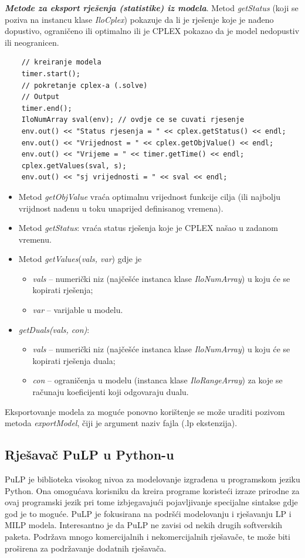 \documentclass[a4paper, utf8, 11pt, colorlinks]{article}
\begin{document}
 \noindent \textbf{\emph{Metode za eksport rješenja (statistike) iz modela}}. Metod \emph{getStatus} (koji se poziva na instancu klase \emph{IloCplex})  pokazuje da li je rješenje koje je nađeno dopustivo, ograničeno ili optimalno ili je CPLEX pokazao da je model nedopustiv ili neogranicen.
 
 \begin{verbatim}
 	// kreiranje modela 
 	timer.start();
 	// pokretanje cplex-a (.solve)
 	// Output
 	timer.end();
 	IloNumArray sval(env); // ovdje ce se cuvati rjesenje
 	env.out() << "Status rjesenja = " << cplex.getStatus() << endl;
 	env.out() << "Vrijednost = " << cplex.getObjValue() << endl;
 	env.out() << "Vrijeme = " << timer.getTime() << endl;
 	cplex.getValues(sval, s);
 	env.out() << "sj vrijednosti = " << sval << endl;
 \end{verbatim}
\begin{itemize}
	\item Metod \emph{getObjValue} vraća optimalnu vrijednost funkcije cilja (ili najbolju vrijdnost nađenu u toku unaprijed definisanog vremena).
	\item Metod \emph{getStatus}: vraća status rješenja koje je CPLEX našao u zadanom vremenu.
	\item Metod \emph{getValues}(\emph{vals, var}) gdje je 
	\begin{itemize}
	 	  \item \emph{vals} -- numerički niz (najčešće instanca klase \emph{IloNumArray}) u koju će se kopirati rješenja;    
          \item \emph{var} -- varijable u modelu.
    \end{itemize}
     \item \emph{getDuals(vals, con)}:
     \begin{itemize}
     	\item \emph{vals} -- numerički niz (najčešće instanca klase \emph{IloNumArray}) u koju će se kopirati rješenja duala;
     	\item \emph{con} -- ograničenja u modelu (instanca klase \emph{IloRangeArray}) za koje se računaju koeficijenti koji odgovaraju dualu. 
     \end{itemize}
\end{itemize}
Eksportovanje modela za moguće ponovno korištenje se može uraditi pozivom metoda \emph{exportModel}, čiji je argument naziv fajla (.lp ekstenzija).  
 \subsection{Rješavač PuLP u Python-u}
 PuLP je biblioteka visokog nivoa za modelovanje izgrađena u programskom jeziku Python.  
 Ona omogućava korisniku da kreira programe koristeći izraze prirodne za ovaj programski jezik 
 pri tome izbjegavajući pojavljivanje specijalne sintakse gdje god je to moguće. PuLP je fokusirana na podršći modelovanju i rješavanju LP i MILP modela. Interesantno je da PuLP 
 ne zavisi od nekih drugih softverskih paketa.   Podržava mnogo komercijalnih i nekomercijalnih rješavače, te može biti proširena za podržavanje dodatnih rješavača. 
 
\end{document}
